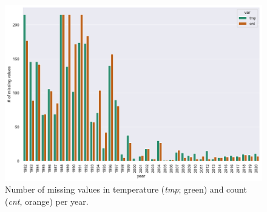 \begin{figure}[H]
	\centering
	\includegraphics[width=0.9\linewidth]{figs/nans_per-year}
	\caption{Number of missing values in temperature (\textit{tmp}; green) and count (\textit{cnt}, orange) per year.}
	\label{fig:nans-per-year}
\end{figure}